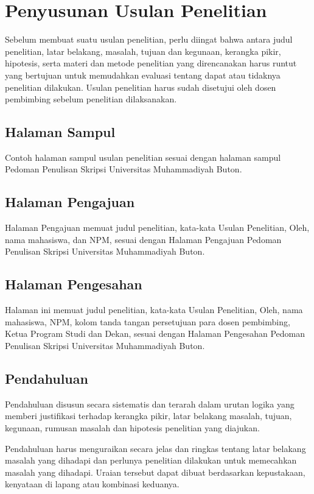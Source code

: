 \section{Penyusunan Usulan Penelitian}
Sebelum membuat suatu usulan penelitian, perlu diingat bahwa antara judul penelitian, latar belakang, masalah, tujuan dan kegunaan, kerangka pikir, hipotesis, serta materi dan metode penelitian yang direncanakan harus runtut yang bertujuan untuk memudahkan evaluasi tentang dapat atau tidaknya penelitian dilakukan. Usulan penelitian harus sudah disetujui oleh dosen pembimbing sebelum penelitian dilaksanakan.

\subsection{Halaman Sampul}
Contoh halaman sampul usulan penelitian sesuai dengan halaman sampul Pedoman Penulisan Skripsi Universitas Muhammadiyah Buton.

\subsection{Halaman Pengajuan}
Halaman Pengajuan memuat judul penelitian, kata-kata Usulan Penelitian, Oleh, nama mahasiswa, dan NPM, sesuai dengan Halaman Pengajuan Pedoman Penulisan Skripsi Universitas Muhammadiyah Buton.

\subsection{Halaman Pengesahan}
Halaman ini memuat judul penelitian, kata-kata Usulan Penelitian, Oleh, nama mahasiswa, NPM, kolom tanda tangan persetujuan para dosen pembimbing, Ketua Program Studi dan Dekan, sesuai dengan Halaman Pengesahan Pedoman Penulisan Skripsi Universitas Muhammadiyah Buton.

\subsection{Pendahuluan}
Pendahuluan disusun secara sistematis dan terarah dalam urutan logika yang memberi justifikasi terhadap kerangka pikir, latar belakang masalah, tujuan, kegunaan, rumusan masalah dan hipotesis penelitian yang diajukan.

Pendahuluan harus menguraikan secara jelas dan ringkas tentang latar belakang masalah yang dihadapi dan perlunya penelitian dilakukan untuk memecahkan masalah yang dihadapi. Uraian tersebut dapat dibuat berdasarkan kepustakaan, kenyataan di lapang atau kombinasi keduanya.

